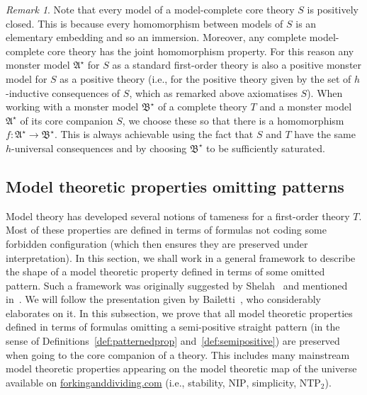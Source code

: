 \documentclass{amsart}
\theoremstyle{definition}
\theoremstyle{remark}
\newtheorem{remark}[theorem]{Remark}
\numberwithin{equation}{section}
\newcommand{\fa}{\mathfrak{A}}
\newcommand{\fb}{\mathfrak{B}}
\begin{document}
\begin{remark}\label{rem:samemonster}
    Note that every model of a model-complete core theory $S$ is positively closed. This is because every homomorphism between models of $S$ is an elementary embedding and so an immersion. Moreover, any complete model-complete core theory has the joint homomorphism property. For this reason any monster model $\fa^\star$ for $S$ as a standard first-order theory is also a positive monster model for $S$ as a positive theory (i.e., for the positive theory given by the set of $h$-inductive consequences of $S$, which as remarked above axiomatises $S$). When working with a monster model $\fb^\star$ of a complete theory $T$ and a monster model $\fa^\star$ of its core companion  $S$, we choose these so that there is a homomorphism $f \colon \fa^\star\to\fb^\star$. This is always achievable using the fact that $S$ and $T$ have the same $h$-universal consequences and by choosing $\fb^\star$ to be sufficiently saturated. 
\end{remark}


\subsection{Model theoretic properties omitting patterns}\label{sub:patterns}


Model theory has developed several notions of tameness for a first-order theory $T$. Most of these properties are defined in terms of formulas not coding some forbidden configuration (which then ensures they
are preserved under interpretation). In this section, we shall work in a general framework to describe the shape of a model theoretic property defined in terms of some omitted pattern. Such a framework was originally suggested by Shelah~\cite[Definition 5.17]{saharon2000not} and mentioned in~\cite{kruckman2024new}. We will follow the presentation given by Bailetti~\cite{bailetti2024walk}, who considerably elaborates on it. 
In this subsection, we prove that all model theoretic properties defined in terms of formulas omitting a semi-positive straight pattern (in the sense of Definitions~\ref{def:patternedprop} and~\ref{def:semipositive}) are preserved when going to the core companion  of a theory.
This includes many mainstream model theoretic properties appearing on the model theoretic map of the universe available on \href{www.forkinganddividing.com}{forkinganddividing.com} (i.e., stability, $\mathrm{NIP}$, 
simplicity, $\mathrm{NTP_2}$).
\end{document}
